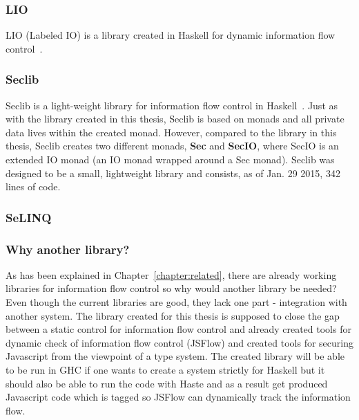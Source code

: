 \subsubsection{LIO}
LIO (Labeled IO) is a library created in Haskell for dynamic information flow control~\cite{lio-2011}.
\subsubsection{Seclib}
Seclib is a light-weight library for information flow control in Haskell~\cite{seclib, seclib_git}. Just as with the library created in this thesis, Seclib is based on monads and all private data lives within the created monad. However, compared to the library in this thesis, Seclib creates two different monads, \textbf{Sec} and \textbf{SecIO}, where SecIO is an extended IO monad (an IO monad wrapped around a Sec monad). Seclib was designed to be a small, lightweight library and consists, as of Jan. 29 2015, 342 lines of code.
\subsubsection{SeLINQ}

\subsubsection{Why another library?}
As has been explained in Chapter~\ref{chapter:related}, there are already working libraries for information flow control so why would another library be needed? Even though the current libraries are good, they lack one part - integration with another system. The library created for this thesis is supposed to close the gap between a static control for information flow control and already created tools for dynamic check of information flow control (JSFlow) and created tools for securing Javascript from the viewpoint of a type system. The created library will be able to be run in GHC if one wants to create a system strictly for Haskell but it should also be able to run the code with Haste and as a result get produced Javascript code which is tagged so JSFlow can dynamically track the information flow.
